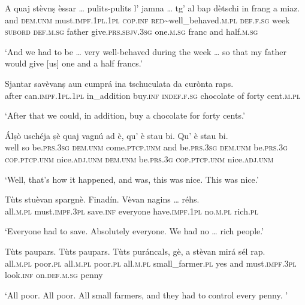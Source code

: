 \begin{linenumbers}
\gll    A quaj stèvnṣ èssar … pulits-pulits l’ jamna … tg’ al bap dètschi\footnotemark{} in frang a miaz.\\
and \textsc{dem.unm} must.\textsc{impf.1pl.1pl} \textsc{cop.inf} {} \textsc{red}\textasciitilde{well\_behaved}.\textsc{m.pl} \textsc{def.f.sg} week {}  \textsc{subord} \textsc{def.m.sg} father  give.\textsc{prs.sbjv.3sg} one.\textsc{m.sg} franc and half.\textsc{m.sg}\\
\end{linenumbers}
\medskip
\glt `And we had to be … very well-behaved during the week … so that my father would give [us] one and a half francs.'
\medskip

\begin{linenumbers}
\gll    Sjantar savèvanṣ aun cumprá ina tschuculata da curònta raps.\\
after can.\textsc{impf.1pl.1pl} in\_addition buy.\textsc{inf} \textsc{indef.f.sg} chocolate of forty  cent.\textsc{m.pl}\\
\end{linenumbers}
\medskip
\glt `After that we could, in addition, buy a chocolate for forty cents.'
\medskip

\begin{linenumbers}
\gll    Álṣò uschéja ṣè quaj vagnú ad è, qu’ è stau bi. Qu’ è stau bi. \\
well so be.\textsc{prs.3sg} \textsc{dem.unm} come.\textsc{ptcp.unm} and be.\textsc{prs.3sg} \textsc{dem.unm} be.\textsc{prs.3g} \textsc{cop.ptcp.unm}  nice.\textsc{adj.unm} \textsc{dem.unm} be.\textsc{prs.3g} \textsc{cop.ptcp.unm}  nice.\textsc{adj.unm} \\
\end{linenumbers}
\medskip
\glt `Well, that’s how it happened, and was, this was nice. This was nice.'
\medskip

\begin{linenumbers}
\gll    Tùts stuèvan spargnè. Finadín. Vèvan nagins … réhs.\\
 all.\textsc{m.pl} must.\textsc{impf.3pl} save.\textsc{inf} everyone have.\textsc{impf.1pl} no.\textsc{m.pl} {} rich.\textsc{pl}\\
\end{linenumbers}
\medskip
\glt `Everyone had to save. Absolutely everyone. We had no … rich people.'
\medskip

\largerpage
\begin{linenumbers}
\gll    Tùts paupars. Tùts paupars. Tùts puráncals, gè, a stèvan mirá sél rap.\\
 all.\textsc{m.pl} poor.\textsc{pl} all.\textsc{m.pl} poor.\textsc{pl}  all.\textsc{m.pl} small\_farmer.\textsc{pl} yes and must.\textsc{impf.3pl} look.\textsc{inf} on.\textsc{def.m.sg} penny\\
\end{linenumbers}
\medskip
\glt `All poor. All poor. All small farmers, and they had to control every penny. '

